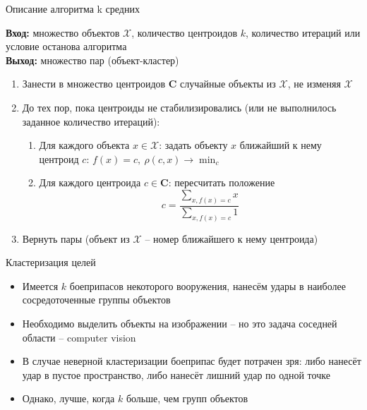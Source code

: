 \documentclass[compress,unicode]{beamer}
\begin{document}
\begin{frame}{Описание алгоритма k средних}
\begin{block}{}
\small
{\bf\color{main}Вход:} множество объектов $\mathcal{X}$, количество центроидов $k$, количество итераций или условие останова алгоритма \\
{\bf\color{main}Выход:} множество пар (объект-кластер) \\
\begin{enumerate}
\item Занести в множество центроидов $\mathbf{C}$ случайные объекты из $\mathcal{X}$, не изменяя $\mathcal{X}$
\item До тех пор, пока центроиды не стабилизировались (или не выполнилось заданное количество итераций):
\begin{enumerate}
	\item Для каждого объекта $x\in \mathcal{X}$: задать объекту $x$ ближайший к нему центроид $c$: $f(x) = c, ~ \rho(c,x) \to \min_c$
	\item Для каждого центроида $c \in \mathbf{C}$: пересчитать положение 
	$$
	c = \frac{\sum_{x, f(x)=c} x}{\sum_{x, f(x)=c} 1}
	$$
	

\end{enumerate}
\item Вернуть пары (объект из $\mathcal{X}$ -- номер ближайшего к нему центроида)
\end{enumerate}
\end{block}
\end{frame}

\begin{frame}{}
\begin{block}{}
\scriptsize

\end{block}
\end{frame}
\begin{frame}{Кластеризация целей}
\begin{itemize}
\item Имеется $k$ боеприпасов некоторого вооружения, нанесём удары в наиболее сосредоточенные группы объектов
\item Необходимо выделить объекты на изображении -- но это задача соседней области -- computer vision
\item В случае неверной кластеризации боеприпас будет потрачен зря: либо нанесёт удар в пустое пространство, либо нанесёт лишний удар по одной точке
\item Однако, лучше, когда $k$ больше, чем групп объектов

\end{itemize}
\end{frame}
\end{document}
